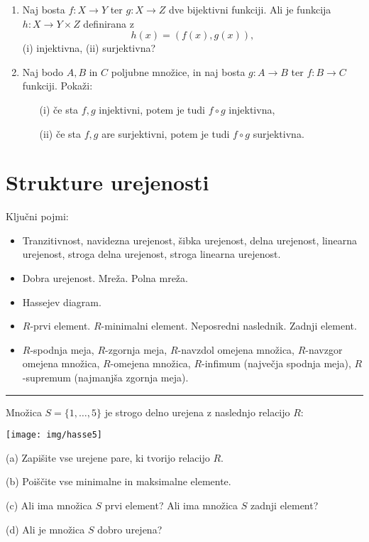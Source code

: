 \documentclass[11pt,paper=b5,footinclude,headinclude]{scrbook} %
\newtheorem{ex}{Vaja\hypertarget{sol:\theex}}[chapter]
\begin{document}
\begin{enumerate}
\item Naj bosta $f\colon X \to Y$ ter $g\colon X\to Z$ dve bijektivni funkciji. Ali je funkcija  $h\colon X \to Y \times Z$ definirana z 
$$h(x) = (f(x),g(x)),$$
(i) injektivna, (ii) surjektivna?
\item Naj bodo $A, B$ in $C$ poljubne množice,
 in naj bosta $g\colon A\to B$ ter $f\colon B\to C$  funkciji. Pokaži:
\begin{enumerate}
\item[(i)] če sta $f, g$  injektivni, potem je tudi $f\circ g$  injektivna,
\item[(ii)] če sta $f, g$ are surjektivni, potem je tudi $f\circ g$  surjektivna.
\end{enumerate}



\end{enumerate}




\section{Strukture urejenosti}
Ključni pojmi:
\begin{itemize}
\item Tranzitivnost, navidezna urejenost, šibka urejenost, delna urejenost,
linearna urejenost, stroga delna urejenost, stroga linearna urejenost.
\item Dobra urejenost. Mreža. Polna mreža.
\item Hassejev diagram.
\item $R$-prvi element. $R$-minimalni element. Neposredni naslednik. Zadnji element.
\item $R$-spodnja meja, $R$-zgornja meja, $R$-navzdol omejena množica, $R$-navzgor omejena
množica, $R$-omejena množica, $R$-infimum (največja spodnja meja),
$R$-supremum (najmanjša zgornja meja).
\end{itemize}
\hrule
\begin{ex}
Množica $S=\{1,\ldots,5\}$ je strogo delno urejena z naslednjo relacijo $R$:
\begin{center}
\texttt{[image: img/hasse5]}
\end{center}

(a) Zapišite vse urejene pare, ki tvorijo relacijo $R$.

(b) Poiščite vse minimalne in maksimalne elemente.

(c) Ali ima množica $S$ prvi element? Ali ima množica $S$ zadnji element?

(d) Ali je množica $S$ dobro urejena?
\end{ex}
\end{document}
